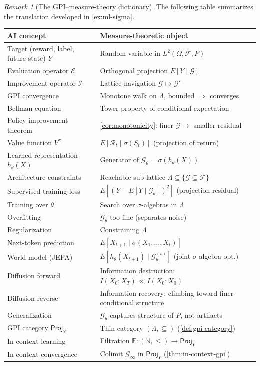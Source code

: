 \documentclass[12pt]{amsart}
\theoremstyle{definition}
\theoremstyle{remark}
\newtheorem*{remark}{Remark}
\newcommand{\cF}{\mathcal{F}}
\newcommand{\Proj}{\mathsf{Proj}}
\begin{document}
\begin{remark}[The GPI--measure-theory dictionary]\label{rmk:ml-dictionary}
The following table summarizes the translation developed in \cref{ex:ml-sigma}.

\medskip
\begin{center}
\renewcommand{\arraystretch}{1.25}
\small
\begin{tabular}{@{}p{}p{}@{}}
\hline
\textbf{AI concept} & \textbf{Measure-theoretic object} \\
\hline
Target (reward, label, future state) $Y$ & Random variable in $L^2(\Omega, \cF, P)$ \\
Evaluation operator $\mathcal{E}$ & Orthogonal projection $E[Y \mid \mathcal{G}]$ \\
Improvement operator $\mathcal{I}$ & Lattice navigation $\mathcal{G} \mapsto \mathcal{G}'$ \\
GPI convergence & Monotone walk on $\Lambda$, bounded $\Rightarrow$ converges \\
Bellman equation & Tower property of conditional expectation \\
Policy improvement theorem & \cref{cor:monotonicity}: finer $\mathcal{G} \to$ smaller residual \\
Value function $V^\pi$ & $E[\mathcal{R}_t \mid \sigma(S_t)]$ (projection of return) \\
\hline
Learned representation $h_\theta(X)$ & Generator of $\mathcal{G}_\theta = \sigma(h_\theta(X))$ \\
Architecture constraints & Reachable sub-lattice $\Lambda \subseteq \{\mathcal{G} \subseteq \cF\}$ \\
Supervised training loss & $E[(Y - E[Y \mid \mathcal{G}_\theta])^2]$ (projection residual) \\
Training over $\theta$ & Search over $\sigma$-algebras in $\Lambda$ \\
Overfitting & $\mathcal{G}_\theta$ too fine (separates noise) \\
Regularization & Constraining $\Lambda$ \\
\hline
Next-token prediction & $E[X_{t+1} \mid \sigma(X_1, \ldots, X_t)]$ \\
World model (JEPA) & $E[h_\theta(X_{t+1}) \mid \mathcal{G}_\theta^{(t)}]$ (joint $\sigma$-algebra opt.) \\
Diffusion forward & Information destruction: $I(X_0; X_T) \ll I(X_0; X_0)$ \\
Diffusion reverse & Information recovery: climbing toward finer conditional structure \\
Generalization & $\mathcal{G}_\theta$ captures structure of $P$, not artifacts \\
\hline
GPI category $\Proj_Y$ & Thin category $(\Lambda, \subseteq)$ (\cref{def:gpi-category}) \\
In-context learning & Filtration $\mathbb{F} : (\mathbb{N}, \leq) \to \Proj_Y$ \\
In-context convergence & Colimit $\mathcal{G}_\infty$ in $\Proj_Y$ (\cref{thm:in-context-gpi}) \\
\hline
\end{tabular}
\normalsize
\end{center}
\medskip


\end{remark}
\end{document}
